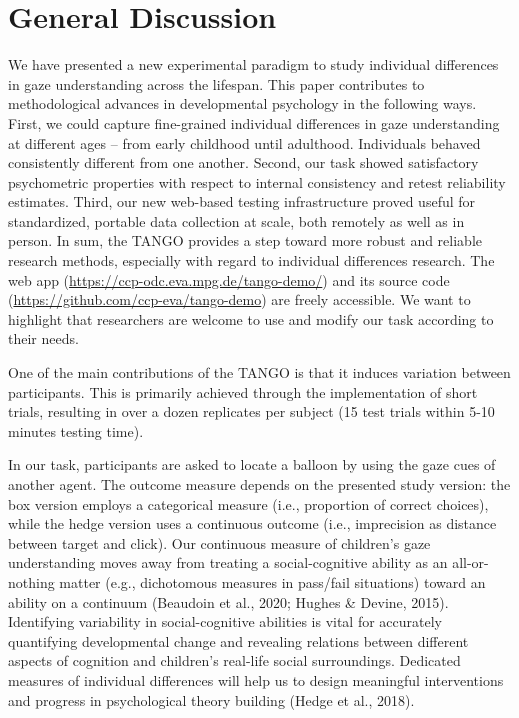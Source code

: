 \documentclass[
  man,floatsintext]{apa6}
\begin{document}
\hypertarget{general-discussion}{%
\section{General Discussion}\label{general-discussion}}

We have presented a new experimental paradigm to study individual differences in gaze understanding across the lifespan.
This paper contributes to methodological advances in developmental psychology in the following ways.
First, we could capture fine-grained individual differences in gaze understanding at different ages -- from early childhood until adulthood.
Individuals behaved consistently different from one another.
Second, our task showed satisfactory psychometric properties with respect to internal consistency and retest reliability estimates.
Third, our new web-based testing infrastructure proved useful for standardized, portable data collection at scale, both remotely as well as in person.
In sum, the TANGO provides a step toward more robust and reliable research methods, especially with regard to individual differences research.
The web app (\url{https://ccp-odc.eva.mpg.de/tango-demo/}) and its source code (\url{https://github.com/ccp-eva/tango-demo}) are freely accessible.
We want to highlight that researchers are welcome to use and modify our task according to their needs.

One of the main contributions of the TANGO is that it induces variation between participants.
This is primarily achieved through the implementation of short trials, resulting in over a dozen replicates per subject (15 test trials within 5-10 minutes testing time).

In our task, participants are asked to locate a balloon by using the gaze cues of another agent.
The outcome measure depends on the presented study version: the box version employs a categorical measure (i.e., proportion of correct choices), while the hedge version uses a continuous outcome (i.e., imprecision as distance between target and click).
Our continuous measure of children's gaze understanding moves away from treating a social-cognitive ability as an all-or-nothing matter (e.g., dichotomous measures in pass/fail situations) toward an ability on a continuum (Beaudoin et al., 2020; Hughes \& Devine, 2015).
Identifying variability in social-cognitive abilities is vital for accurately quantifying developmental change and revealing relations between different aspects of cognition and children's real-life social surroundings.
Dedicated measures of individual differences will help us to design meaningful interventions and progress in psychological theory building (Hedge et al., 2018).
\end{document}
